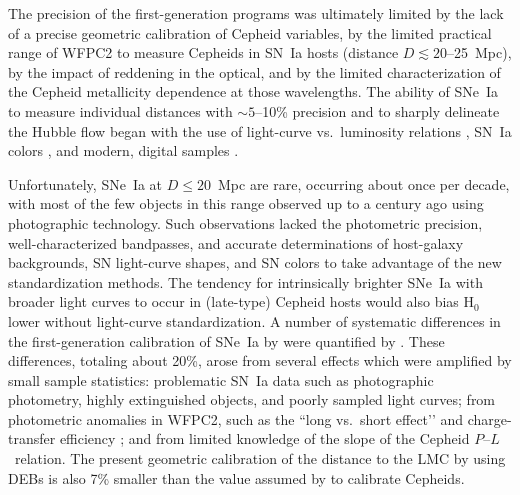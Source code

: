 \documentclass[12pt]{aastex631}
\newcommand{\PLs}{$P$--$L$\ }
\begin{document}
The precision of the first-generation programs was ultimately limited by the lack of a precise geometric calibration of Cepheid variables, by the limited practical range of WFPC2 to measure Cepheids in SN~Ia hosts (distance $D \lesssim 20$--25~Mpc), by the impact of reddening in the optical, and by the limited characterization of the Cepheid metallicity dependence at those wavelengths.  The ability of SNe~Ia to measure individual distances with $\sim 5$--10\% precision and to sharply delineate the Hubble flow began with the use of light-curve vs.~luminosity relations \citep{Phillips:1993}, SN~Ia colors \citep{Riess:1996,Tripp:1998,Phillips:1999}, and modern, digital samples \citep{Hamuy:1996,Riess:1999}. 
    
Unfortunately, SNe~Ia at $D \leq 20$~Mpc are rare, occurring about once per decade, with most of the few objects in this range observed up to a century ago using photographic technology. Such observations lacked the photometric precision, well-characterized bandpasses, and accurate determinations of host-galaxy backgrounds, SN light-curve shapes, and SN colors to take advantage of the new standardization methods.  The tendency for intrinsically brighter SNe~Ia with broader light curves to occur in (late-type) Cepheid hosts would also bias H$_0$ lower without light-curve standardization.  A number of systematic differences in the first-generation calibration of SNe~Ia by \citet{sandage06} were quantified by \citet[][Table 16]{riess05}.  These differences, totaling about 20\%, arose from several effects which were amplified by small sample statistics: problematic SN~Ia data such as photographic photometry, highly extinguished objects, and poorly sampled light curves; from photometric anomalies in WFPC2, such as the ``long vs.~short effect’’ \citep{Holtzman:1995} and charge-transfer efficiency \citep[CTE; e.g.,][]{whitmore99}; and from limited knowledge of the slope of the Cepheid \PLs relation. The present geometric calibration of the distance to the LMC by \citet{Pietrzynski:2019} using DEBs is also 7\% smaller than the value assumed by \citet{sandage06} to calibrate Cepheids.
    
\end{document}
